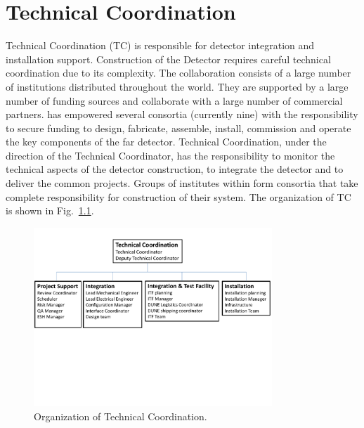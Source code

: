 \chapter{Technical Coordination}
\label{ch:fdsp-coord}

Technical Coordination (TC) is responsible for detector integration
and installation support. Construction of the  Detector
requires careful technical coordination due to its complexity.
The  collaboration consists of a large number of
institutions distributed throughout the world. They are supported by a
large number of funding sources and collaborate with a large number of
commercial partners.  has empowered several consortia
(currently nine) with the responsibility to secure funding to design,
fabricate, assemble, install, commission and operate the key
components of the  far detector.
 Technical Coordination, under the direction of the
 Technical Coordinator, has the responsibility to monitor
the technical aspects of the detector construction, to integrate the
detector and to deliver the common projects. Groups of institutes
within  form consortia that take complete responsibility
for construction of their system. The organization of TC is shown in
Fig.~\ref{fig:TC_orgchart}.
\begin{figure}[htb]
  \begin{center}
    \includegraphics[width=0.8\textwidth]{far-detector-generic/figures/TP_TC_Org_Chart}
    \caption{Organization of Technical Coordination.}
    \label{fig:TC_orgchart}
  \end{center}
\end{figure}
